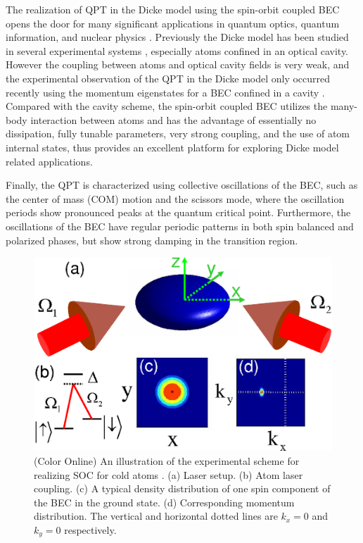 \documentclass[prl,twocolumn,superscriptaddress,showpacs,floatfix]{revtex4}
\begin{document}
The realization of QPT in the Dicke model using the spin-orbit coupled BEC
opens the door for many significant applications in quantum optics, quantum
information, and nuclear physics \cite{DM1,DM2,DM3}. Previously the Dicke
model has been studied in several experimental systems \cite%
{Schoelkopf,Garraway}, especially atoms confined in an optical cavity.
However the coupling between atoms and optical cavity fields is very weak,
and the experimental observation of the QPT in the Dicke model only occurred
recently using the momentum eigenstates for a BEC confined in a cavity \cite%
{Baumann}. Compared with the cavity scheme, the spin-orbit coupled BEC
utilizes the many-body interaction between atoms and has the advantage of
essentially no dissipation, fully tunable parameters, very strong coupling,
and the use of atom internal states, thus provides an excellent platform for
exploring Dicke model related applications.

Finally, the QPT is characterized using collective oscillations of the BEC,
such as the center of mass (COM) motion and the scissors mode, where the
oscillation periods show pronounced peaks at the quantum critical point.
Furthermore, the oscillations of the BEC have regular periodic patterns in
both spin balanced and polarized phases, but show strong damping in the
transition region.

\begin{figure}[t]
\includegraphics[width=0.7\linewidth]{Fig1.eps}
\caption{(Color Online) An illustration of the experimental scheme for
realizing SOC for cold atoms \protect\cite{Lin}. (a) Laser setup. (b) Atom
laser coupling. (c) A typical density distribution of one spin component of
the BEC in the ground state. (d) Corresponding momentum distribution. The
vertical and horizontal dotted lines are $k_{x}=0$ and $k_{y}=0$
respectively.}
\label{setup}
\end{figure}
\end{document}
